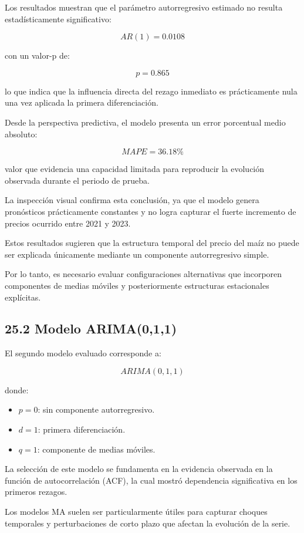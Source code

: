 \documentclass[11pt]{article}
\providecommand{\tightlist}{%
      \setlength{\itemsep}{0pt}\setlength{\parskip}{0pt}}
\begin{document}
Los resultados muestran que el parámetro autorregresivo estimado no
resulta estadísticamente significativo:

\[
AR(1)=0.0108
\]

con un valor-p de:

\[
p=0.865
\]

lo que indica que la influencia directa del rezago inmediato es
prácticamente nula una vez aplicada la primera diferenciación.

Desde la perspectiva predictiva, el modelo presenta un error porcentual
medio absoluto:

\[
MAPE = 36.18\%
\]

valor que evidencia una capacidad limitada para reproducir la evolución
observada durante el periodo de prueba.

La inspección visual confirma esta conclusión, ya que el modelo genera
pronósticos prácticamente constantes y no logra capturar el fuerte
incremento de precios ocurrido entre 2021 y 2023.

Estos resultados sugieren que la estructura temporal del precio del maíz
no puede ser explicada únicamente mediante un componente autorregresivo
simple.

Por lo tanto, es necesario evaluar configuraciones alternativas que
incorporen componentes de medias móviles y posteriormente estructuras
estacionales explícitas.

    \hypertarget{modelo-arima011}{%
\subsection{25.2 Modelo ARIMA(0,1,1)}\label{modelo-arima011}}

El segundo modelo evaluado corresponde a:

\[
ARIMA(0,1,1)
\]

donde:

\begin{itemize}
\tightlist
\item
  \(p=0\): sin componente autorregresivo.
\item
  \(d=1\): primera diferenciación.
\item
  \(q=1\): componente de medias móviles.
\end{itemize}

La selección de este modelo se fundamenta en la evidencia observada en
la función de autocorrelación (ACF), la cual mostró dependencia
significativa en los primeros rezagos.

Los modelos MA suelen ser particularmente útiles para capturar choques
temporales y perturbaciones de corto plazo que afectan la evolución de
la serie.
\end{document}
